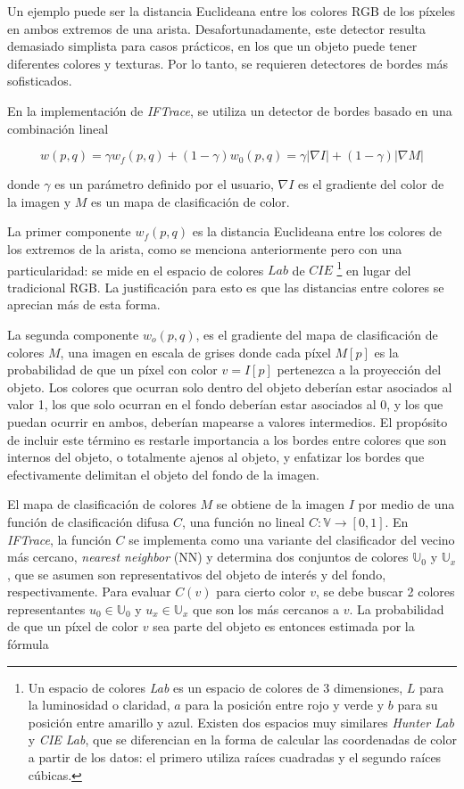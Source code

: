 \documentclass[a4paper,10pt]{article}
\begin{document}
Un ejemplo puede ser la distancia Euclideana entre los colores RGB de los píxeles
en ambos extremos de una arista. Desafortunadamente, este detector resulta demasiado
simplista para casos prácticos, en los que un objeto puede tener diferentes colores y
texturas. Por lo tanto, se requieren detectores de bordes más sofisticados.

En la implementación de \textit{IFTrace}, se utiliza un detector de bordes basado en
una combinación lineal

\begin{equation}
   \label{eq:IFTrace-edge-detector}
   w(p,q) = \gamma w_{f}(p,q) + (1 - \gamma)w_{0}(p,q) = \gamma |\nabla I| + (1 - \gamma)|\nabla M|
\end{equation}

donde $\gamma$ es un parámetro definido por el usuario, $\nabla I$ es el gradiente
del color de la imagen y $M$ es un mapa de clasificación de color.

La primer componente $w_{f}(p,q)$ es la distancia Euclideana entre los colores
de los extremos de la arista, como se menciona anteriormente pero con una
particularidad: se mide en el espacio de colores $Lab$ de $CIE$ \footnote{ Un
  espacio de colores \textit{Lab} es un espacio de colores de 3 dimensiones,
  $L$ para la luminosidad o claridad, $a$ para la posición entre rojo y verde y
  $b$ para su posición entre amarillo y azul. Existen dos espacios muy similares
  \textit{Hunter Lab} y \textit{CIE Lab}, que se diferencian en la forma de
  calcular las coordenadas de color a partir de los datos: el primero utiliza
  raíces cuadradas y el segundo raíces cúbicas.} en lugar del tradicional RGB.
La justificación para esto es que las distancias entre colores se aprecian
más de esta forma.

La segunda componente $w_{o}(p,q)$, es el gradiente del mapa de clasificación
de colores $M$, una imagen en escala de grises donde cada píxel $M[p]$ es
la probabilidad de que un píxel con color $v=I[p]$ pertenezca a la proyección
del objeto. Los colores que ocurran solo dentro del objeto deberían estar
asociados al valor 1, los que solo ocurran en el fondo deberían estar
asociados al 0, y los que puedan ocurrir en ambos, deberían mapearse a
valores intermedios. El propósito de incluir este término es restarle
importancia a los bordes entre colores que son internos del objeto, o
totalmente ajenos al objeto, y enfatizar los bordes que efectivamente
delimitan el objeto del fondo de la imagen.

El mapa de clasificación de colores $M$ se obtiene de la imagen $I$ por medio de una
función de clasificación difusa $C$, una función no lineal $C : \mathbb{V} \to [0,1]$.
En \textit{IFTrace}, la función $C$ se implementa como una variante del clasificador
del vecino más cercano, \textit{nearest neighbor} (NN) y determina dos conjuntos de
colores $\mathbb{U}_{0}$ y $\mathbb{U}_{x}$, que se asumen son representativos del objeto de interés y del fondo, respectivamente.
Para evaluar $C(v)$ para
cierto color $v$, se debe buscar 2 colores representantes $u_{0} \in \mathbb{U}_{0}$
y $u_{x} \in \mathbb{U}_{x}$ que son los más cercanos a $v$.
La probabilidad de que un píxel de color $v$ sea parte del objeto es entonces estimada
por la fórmula
\end{document}
